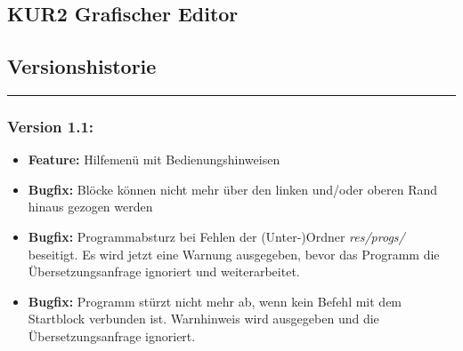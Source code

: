 \documentclass[a4paper,10pt]{article}
\begin{document}
\begin{center}
\section*{KUR2 Grafischer Editor}
\subsection*{Versionshistorie}
\end{center}

\hrule
\vspace{.5cm}

\subsubsection*{Version 1.1:}
\begin{itemize}
\item \textbf{Feature:} Hilfemenü mit Bedienungshinweisen
\item \textbf{Bugfix:} Blöcke können nicht mehr über den linken und/oder oberen Rand hinaus gezogen werden
\item \textbf{Bugfix:} Programmabsturz bei Fehlen der (Unter-)Ordner \textit{res/progs/} beseitigt. Es wird jetzt eine Warnung ausgegeben, bevor das Programm die Übersetzungsanfrage ignoriert und weiterarbeitet.
\item \textbf{Bugfix:} Programm stürzt nicht mehr ab, wenn kein Befehl mit dem Startblock verbunden ist. Warnhinweis wird ausgegeben und die Übersetzungsanfrage ignoriert.
\end{itemize}
\end{document}
